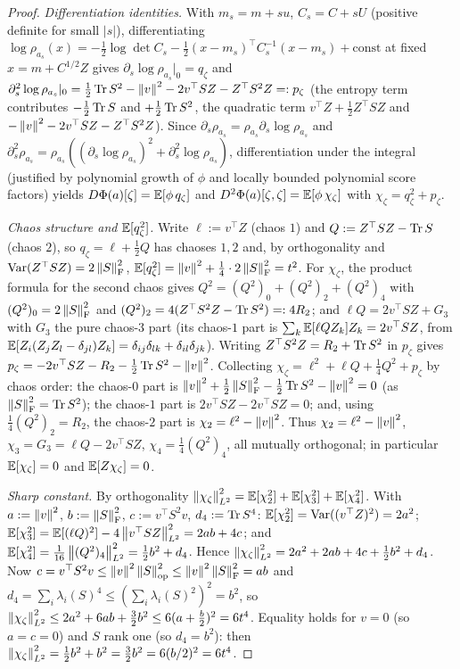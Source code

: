 \begin{proof}
\emph{Differentiation identities.} With $m_s=m+su$, $C_s=C+sU$ (positive definite for
small $|s|$), differentiating $\log\rho_{a_s}(x)=-\tfrac12\log\det C_s-\tfrac12(x-m_s)^\top C_s^{-1}(x-m_s)+\text{const}$
at fixed $x=m+C^{1/2}Z$ gives $\partial_s\log\rho_{a_s}|_0=q_\zeta$ and
$\partial_s^2\log\rho_{a_s}|_0=\tfrac12\operatorname{Tr} S^2-\left\lVert v\right\rVert^2-2v^\top SZ-Z^\top S^2Z=:p_\zeta$
(the entropy term contributes $-\tfrac12\operatorname{Tr} S$ and $+\tfrac12\operatorname{Tr} S^2$, the quadratic term
$v^\top Z+\tfrac12Z^\top SZ$ and $-\left\lVert v\right\rVert^2-2v^\top SZ-Z^\top S^2Z$). Since
$\partial_s\rho_{a_s}=\rho_{a_s}\partial_s\log\rho_{a_s}$ and
$\partial_s^2\rho_{a_s}=\rho_{a_s}((\partial_s\log\rho_{a_s})^2+\partial_s^2\log\rho_{a_s})$,
differentiation under the integral (justified by polynomial growth of $\phi$ and locally
bounded polynomial score factors) yields $D\Phi(a)[\zeta]=\mathbb{E}[\phi\,q_\zeta]$ and
$D^2\Phi(a)[\zeta,\zeta]=\mathbb{E}[\phi\,\chi_\zeta]$ with $\chi_\zeta=q_\zeta^2+p_\zeta$.

\emph{Chaos structure and $\mathbb{E}[q_\zeta^2]$.} Write $\ell:=v^\top Z$ (chaos $1$) and
$Q:=Z^\top SZ-\operatorname{Tr} S$ (chaos $2$), so $q_\zeta=\ell+\tfrac12Q$ has chaoses $1,2$ and, by
orthogonality and $\operatorname{Var}(Z^\top SZ)=2\left\lVert S\right\rVert_{\mathrm{F}}^2$,
$\mathbb{E}[q_\zeta^2]=\left\lVert v\right\rVert^2+\tfrac14\cdot2\left\lVert S\right\rVert_{\mathrm{F}}^2=t^2$. For $\chi_\zeta$, the
product formula for the second chaos gives $Q^2=(Q^2)_0+(Q^2)_2+(Q^2)_4$ with
$(Q^2)_0=2\left\lVert S\right\rVert_{\mathrm{F}}^2$ and $(Q^2)_2=4(Z^\top S^2Z-\operatorname{Tr} S^2)=:4R_2$; and
$\ell Q=2v^\top SZ+G_3$ with $G_3$ the pure chaos-$3$ part (its chaos-$1$ part is
$\sum_k\mathbb{E}[\ell Q Z_k]Z_k=2v^\top SZ$, from
$\mathbb{E}[Z_i(Z_jZ_l-\delta_{jl})Z_k]=\delta_{ij}\delta_{lk}+\delta_{il}\delta_{jk}$). Writing
$Z^\top S^2Z=R_2+\operatorname{Tr} S^2$ in $p_\zeta$ gives $p_\zeta=-2v^\top SZ-R_2-\tfrac12\operatorname{Tr} S^2-\left\lVert v\right\rVert^2$.
Collecting $\chi_\zeta=\ell^2+\ell Q+\tfrac14Q^2+p_\zeta$ by chaos order: the chaos-$0$ part
is $\left\lVert v\right\rVert^2+\tfrac12\left\lVert S\right\rVert_{\mathrm{F}}^2-\tfrac12\operatorname{Tr} S^2-\left\lVert v\right\rVert^2=0$ (as
$\left\lVert S\right\rVert_{\mathrm{F}}^2=\operatorname{Tr} S^2$); the chaos-$1$ part is $2v^\top SZ-2v^\top SZ=0$; and, using
$\tfrac14(Q^2)_2=R_2$, the chaos-$2$ part is $\chi_2=\ell^2-\left\lVert v\right\rVert^2$. Thus
$\chi_2=\ell^2-\left\lVert v\right\rVert^2$, $\chi_3=G_3=\ell Q-2v^\top SZ$, $\chi_4=\tfrac14(Q^2)_4$, all
mutually orthogonal; in particular $\mathbb{E}[\chi_\zeta]=0$ and $\mathbb{E}[Z\chi_\zeta]=0$.

\emph{Sharp constant.} By orthogonality
$\left\lVert \chi_\zeta\right\rVert_{L^2}^2=\mathbb{E}[\chi_2^2]+\mathbb{E}[\chi_3^2]+\mathbb{E}[\chi_4^2]$. With $a:=\left\lVert v\right\rVert^2$,
$b:=\left\lVert S\right\rVert_{\mathrm{F}}^2$, $c:=v^\top S^2v$, $d_4:=\operatorname{Tr} S^4$: $\mathbb{E}[\chi_2^2]=\operatorname{Var}((v^\top Z)^2)=2a^2$;
$\mathbb{E}[\chi_3^2]=\mathbb{E}[(\ell Q)^2]-4\left\lVert v^\top SZ\right\rVert_{L^2}^2=2ab+4c$; and
$\mathbb{E}[\chi_4^2]=\tfrac1{16}\left\lVert (Q^2)_4\right\rVert_{L^2}^2=\tfrac12b^2+d_4$. Hence
$\left\lVert \chi_\zeta\right\rVert_{L^2}^2=2a^2+2ab+4c+\tfrac12b^2+d_4$. Now $c=v^\top S^2v\leq\left\lVert v\right\rVert^2\left\lVert S\right\rVert_{\mathrm{op}}^2\leq\left\lVert v\right\rVert^2\left\lVert S\right\rVert_{\mathrm{F}}^2=ab$
and $d_4=\sum_i\lambda_i(S)^4\leq(\sum_i\lambda_i(S)^2)^2=b^2$, so
$\left\lVert \chi_\zeta\right\rVert_{L^2}^2\leq2a^2+6ab+\tfrac32b^2\leq6(a+\tfrac b2)^2=6t^4$. Equality holds
for $v=0$ (so $a=c=0$) and $S$ rank one (so $d_4=b^2$): then
$\left\lVert \chi_\zeta\right\rVert_{L^2}^2=\tfrac12b^2+b^2=\tfrac32b^2=6(b/2)^2=6t^4$.
\end{proof}

